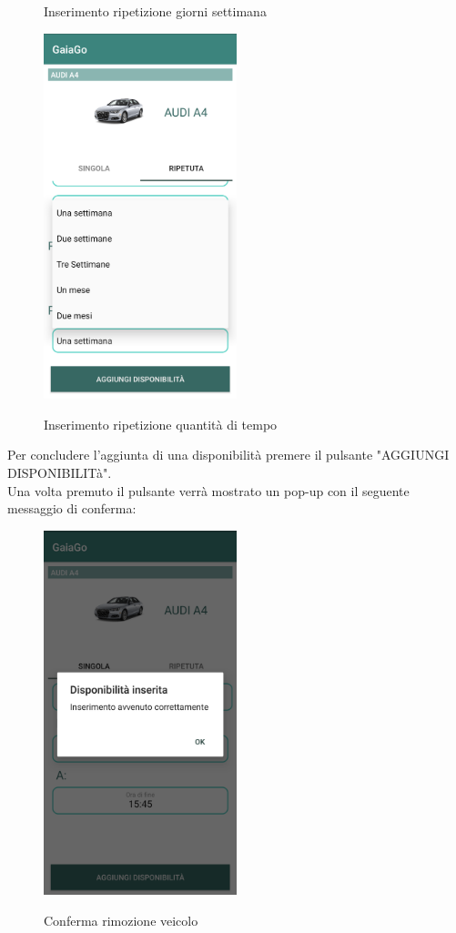 \begin{itemize}
\begin{figure}[H]
		\caption{Inserimento ripetizione giorni settimana}
		\label{disponibilità2}
	\end{figure}
	\begin{figure}[H] 
		\centering 
		\includegraphics[width=0.5\textwidth]{res/images/aggiungi_disponibilita5.png}\\
		\caption{Inserimento ripetizione quantità di tempo}
		\label{disponibilità3}
	\end{figure}
\end{itemize}
Per concludere l'aggiunta di una disponibilità premere il pulsante "AGGIUNGI DISPONIBILITà".\\
Una volta premuto il pulsante verrà mostrato un pop-up con il seguente messaggio di conferma:
\begin{figure}[H] 
	\centering 
	\includegraphics[width=0.5\textwidth]{res/images/conferma_disponibilita.png}\\
	\caption{Conferma rimozione veicolo}
	\label{conferma}
\end{figure}
